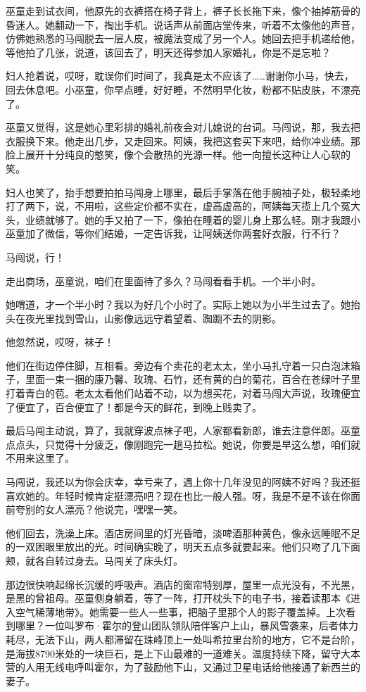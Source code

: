 \documentclass[lang=cn,newtx,12pt,scheme=chinese]{elegantbook}
\begin{document}
巫童走到试衣间，他原先的衣裤搭在椅子背上，裤子长长拖下来，像个抽掉筋骨的昏迷人。她翻动一下，掏出手机。说话声从前面店堂传来，听着不太像他的声音，仿佛她熟悉的马闯脱去一层人皮，被魔法变成了另一个人。她回去把手机递给他，等他拍了几张，说道，该回去了，明天还得参加人家婚礼，你是不是忘啦？

妇人抢着说，哎呀，耽误你们时间了，我真是太不应该了……谢谢你小马，快去，回去休息吧。小巫童，你早点睡，好好睡，不然明早化妆，粉都不贴皮肤，不漂亮了。

巫童又觉得，这是她心里彩排的婚礼前夜会对儿媳说的台词。马闯说，那，我去把衣服换下来。他走出几步，又走回来。阿姨，我把这套买下来吧，给你冲业绩。那脸上展开十分纯良的憨笑，像个会散热的光源一样。他一向擅长这种让人心软的笑。

妇人也笑了，抬手想要拍拍马闯身上哪里，最后手掌落在他手腕袖子处，极轻柔地打了两下，说，不用啦，这些定价都不实在，虚高虚高的，阿姨每天揽上几个冤大头，业绩就够了。她的手又拍了一下，像拍在睡着的婴儿身上那么轻。刚才我跟小巫童加了微信，等你们结婚，一定告诉我，让阿姨送你两套好衣服，行不行？

马闯说，行！

走出商场，巫童说，咱们在里面待了多久？马闯看看手机。一个半小时。

她喟道，才一个半小时？我以为好几个小时了。实际上她以为小半生过去了。她抬头在夜光里找到雪山，山影像远远守着望着、踟蹰不去的阴影。

他忽然说，哎呀，袜子！

他们在街边停住脚，互相看。旁边有个卖花的老太太，坐小马扎守着一只白泡沫箱子，里面一束一捆的康乃馨、玫瑰、石竹，还有黄的白的菊花，百合在苍绿叶子里打着青白的苞。老太太看他们站着不动，以为想买花，对着马闯大声说，玫瑰便宜了便宜了，百合便宜了！都是今天的鲜花，到晚上贱卖了。

最后马闯主动说，算了，我就穿波点袜子吧，人家都看新郎，谁去注意伴郎。巫童点点头，只觉得十分疲乏，像刚跑完一趟马拉松。她说，你要是早这么想，咱们就不用来这里了。

马闯说，我还以为你会庆幸，幸亏来了，遇上你十几年没见的阿姨不好吗？我还挺喜欢她的。年轻时候肯定挺漂亮吧？现在也比一般人强。呀，我是不是不该在你面前夸别的女人漂亮？他说完，嘿嘿一笑。

他们回去，洗澡上床。酒店房间里的灯光昏暗，淡啤酒那种黄色，像永远睡眠不足的一双困眼里放出的光。时间确实晚了，明天五点多就要起来。他们只吻了几下面颊，就各自转过身去。马闯关了床头灯。

那边很快响起绵长沉缓的呼吸声。酒店的窗帘特别厚，屋里一点光没有，不光黑，是黑的曾祖母。巫童侧身躺着，等了一阵，打开枕头下的电子书，接着读那本《进入空气稀薄地带》。她需要一些人一些事，把脑子里那个人的影子覆盖掉。上次看到哪里？一位叫罗布·霍尔的登山团队领队陪伴客户上山，暴风雪袭来，后者体力耗尽，无法下山，两人都滞留在珠峰顶上一处叫希拉里台阶的地方，它不是台阶，是海拔8790米处的一块巨石，是上下山最难的一道难关。温度持续下降，留守大本营的人用无线电呼叫霍尔，为了鼓励他下山，又通过卫星电话给他接通了新西兰的妻子。
\end{document}
